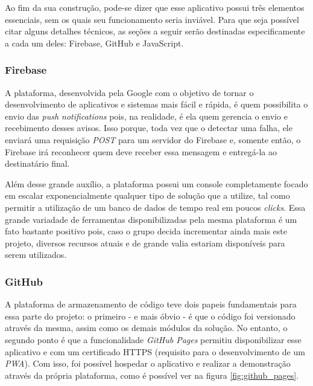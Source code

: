 Ao fim da sua construção, pode-se dizer que esse aplicativo possui três elementos essenciais, sem os quais seu funcionamento seria inviável. Para que seja possível citar alguns detalhes técnicos, as seções a seguir serão destinadas especificamente a cada um deles: Firebase, GitHub e JavaScript.

\subsubsection{Firebase}
\label{subsubsec:firebase}

A plataforma, desenvolvida pela Google com o objetivo de tornar o desenvolvimento de aplicativos e sistemas mais fácil e rápida, é quem possibilita o envio das \textit{push notifications} pois, na realidade, é ela quem gerencia o envio e recebimento desses avisos. Isso porque, toda vez que o \adaptive{} detectar uma falha, ele enviará uma requisição \textit{POST} para um servidor do Firebase e, somente então, o Firebase irá reconhecer quem deve receber essa mensagem e entregá-la ao destinatário final.

Além desse grande auxílio, a plataforma possui um console completamente focado em escalar exponencialmente qualquer tipo de solução que a utilize, tal como permitir a utilização de um banco de dados de tempo real em poucos \textit{clicks}. Essa grande variadade de ferramentas disponibilizadas pela mesma plataforma é um fato bastante positivo pois, caso o grupo decida incrementar ainda mais este projeto, diversos recursos atuais e de grande valia estariam disponíveis para serem utilizados.


\subsubsection{GitHub}
\label{subsubsec:github}

A plataforma de armazenamento de código teve dois papeis fundamentais para essa parte do projeto: o primeiro - e mais óbvio - é que o código foi versionado através da mesma, assim como os demais módulos da solução. No entanto, o segundo ponto é que a funcionalidade \textit{GitHub Pages} permitiu disponibilizar esse aplicativo \online{} e com um certificado HTTPS (requisito para o desenvolvimento de um \textit{PWA}). Com isso, foi possível hospedar o aplicativo e realizar a demonstração através da própria plataforma, como é possível ver na figura \ref{fig:github_pages}.

